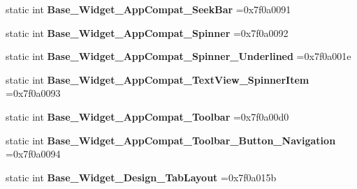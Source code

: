 \begin{DoxyCompactItemize}
\item 
\mbox{\label{classandroid_1_1support_1_1graphics_1_1drawable_1_1R_1_1style_a05fc277a9234f8ed4d38653450b1e331}} 
static int {\bfseries Base\+\_\+\+Widget\+\_\+\+App\+Compat\+\_\+\+Seek\+Bar} =0x7f0a0091
\item 
\mbox{\label{classandroid_1_1support_1_1graphics_1_1drawable_1_1R_1_1style_acd58f546c96135ddde3f8a26d43e60ea}} 
static int {\bfseries Base\+\_\+\+Widget\+\_\+\+App\+Compat\+\_\+\+Spinner} =0x7f0a0092
\item 
\mbox{\label{classandroid_1_1support_1_1graphics_1_1drawable_1_1R_1_1style_a72b5bf8ed64f72f902020d78694ab270}} 
static int {\bfseries Base\+\_\+\+Widget\+\_\+\+App\+Compat\+\_\+\+Spinner\+\_\+\+Underlined} =0x7f0a001e
\item 
\mbox{\label{classandroid_1_1support_1_1graphics_1_1drawable_1_1R_1_1style_ad84a671b5f0efc1c95260fbf9825d98b}} 
static int {\bfseries Base\+\_\+\+Widget\+\_\+\+App\+Compat\+\_\+\+Text\+View\+\_\+\+Spinner\+Item} =0x7f0a0093
\item 
\mbox{\label{classandroid_1_1support_1_1graphics_1_1drawable_1_1R_1_1style_a972347d1276c14725c2e5cea34d7c8da}} 
static int {\bfseries Base\+\_\+\+Widget\+\_\+\+App\+Compat\+\_\+\+Toolbar} =0x7f0a00d0
\item 
\mbox{\label{classandroid_1_1support_1_1graphics_1_1drawable_1_1R_1_1style_af353c203b2ceb4a00cfea7a3b6cbcccc}} 
static int {\bfseries Base\+\_\+\+Widget\+\_\+\+App\+Compat\+\_\+\+Toolbar\+\_\+\+Button\+\_\+\+Navigation} =0x7f0a0094
\item 
\mbox{\label{classandroid_1_1support_1_1graphics_1_1drawable_1_1R_1_1style_a90248c7d16cca202bbfc5adb3116e348}} 
static int {\bfseries Base\+\_\+\+Widget\+\_\+\+Design\+\_\+\+Tab\+Layout} =0x7f0a015b
\item 

\end{DoxyCompactItemize}
